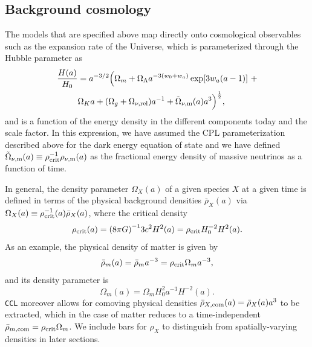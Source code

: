 \documentclass[\docopts]{\docclass}
\newcommand{\ccl}{{\tt CCL}\xspace}
\begin{document}


\subsection{Background cosmology}

The models that are specified above map directly onto cosmological observables such as the expansion rate of the Universe, which is parameterized through the Hubble parameter as
\begin{align}\label{eq:Ha}
\frac{H(a)}{H_0} &= a^{-3/2}\Big(\Omega_{m}+\Omega_{\Lambda} a^{-3(w_0+w_a)}
\exp[3 w_a (a-1)]~+ \nonumber \\ &\Omega_{K} a + (\Omega_{g} + \Omega_{\nu, {\rm rel}}) a^{-1} + \tilde\Omega_{\nu, {\rm m}}(a)a^3\Big)^{\frac{1}{2}} ,
\end{align}
and is a function of the energy density in the different components today and the scale factor. In this expression, we have assumed the CPL parameterization described above for the dark energy equation of state and we have defined $\tilde\Omega_{\nu, {\rm m}}(a) \equiv \rho^{-1}_{\rm crit} \rho_{\nu, {\rm m}}(a)$ as the fractional energy density of massive neutrinos as a function of time.

In general, the density parameter $\Omega_X(a)$ of a given species $X$ at a given time is defined in terms of the physical background densities $\bar\rho_X(a)$ via $\Omega_X(a) \equiv \rho^{-1}_{\rm crit}(a) \bar\rho_X(a)$, where the critical density
\begin{equation}
  \rho_{\rm crit}(a) = {( 8 \pi G)}^{-1} 3c^2H^2(a) = \rho_{\rm crit} H_0^{-2} H^2(a).
\end{equation}
As an example, the physical density of matter is given by
\begin{equation}
  \bar\rho_m(a) = \bar\rho_{m} a^{-3} = \rho_{\rm crit} \Omega_{m} a^{-3},
\end{equation}
and its density parameter is
\begin{equation}
  \Omega_m(a) = \Omega_{m} H_0^{2} a^{-3} H^{-2}(a).
\end{equation}
\ccl moreover allows for comoving physical densities $\bar\rho_{X, {\rm com}}(a) = \bar\rho_X(a) a^3$ to be extracted, which in the case of matter reduces to a time-independent $\bar\rho_{m, {\rm com}} = \rho_{\rm crit} \Omega_{m}$. We include bars for $\rho_X$ to distinguish from spatially-varying densities in later sections.
\end{document}
